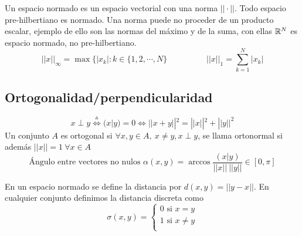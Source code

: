 Un espacio normado es un espacio vectorial con una norma $||\cdot||$. Todo espacio pre-hilbertiano es normado. 
Una norma puede no proceder de un producto escalar, ejemplo de ello son las normas del máximo y de la suma, con ellas $\mathbb{R}^N$ es espacio normado, no pre-hilbertiano.
$$ ||x||_{\infty} =\max \{|x_k| : k\in \{1,2,\cdots,N\} \hspace{2cm} ||x||_1 = \sum_{k=1}^{N} |x_k| $$

\subsection{Ortogonalidad/perpendicularidad}
$$ x\perp y \overset{\vartriangle}{\Longleftrightarrow} 
(x|y) = 0 \Longleftrightarrow
|| x+y ||^2 = ||x||^2 + ||y||^2$$
Un conjunto $A$ es ortogonal si $\forall x,y\in A, \ x\not =y, x\perp y$, se llama ortonormal si además $||x||=1 \ \forall x\in A$
$$ \text{Ángulo entre vectores no nulos } \alpha (x,y)=\arccos \frac{(x|y)}{||x||\ ||y||}\in[0,\pi]  $$

En un espacio normado se define la distancia por $d(x,y) = ||y-x||$. En cualquier conjunto definimos la distancia discreta como 
$$ \sigma (x,y) = 
\left\{ 
\begin{array}{l}
	0 \text{ si } x=y \\
	1 \text{ si } x\not =y \\
\end{array} \right.$$